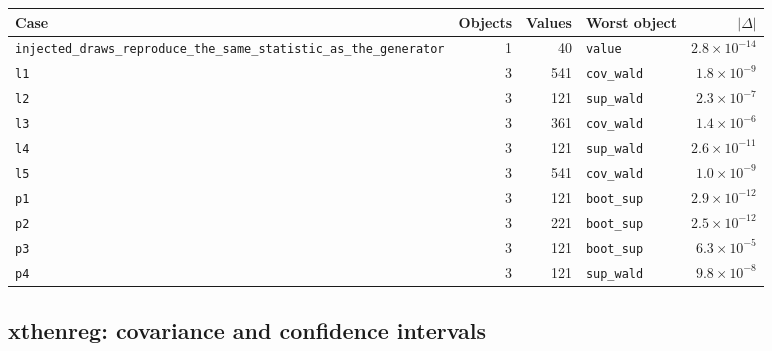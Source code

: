 \documentclass[10.5pt,a4paper]{article}
\begin{document}
\begin{longtable}{@{}p{3.6cm}rrp{4.9cm}r@{}}
\toprule
Case & Objects & Values & Worst object & $|\Delta|$ \\
\midrule
\endhead
\texttt{injected\_\allowbreak{}draws\_\allowbreak{}reproduce\_\allowbreak{}the\_\allowbreak{}same\_\allowbreak{}statistic\_\allowbreak{}as\_\allowbreak{}the\_\allowbreak{}generator} & 1 & 40 & \texttt{value} & $2.8\times10^{-14}$ \\
\texttt{l1} & 3 & 541 & \texttt{cov\_\allowbreak{}wald} & $1.8\times10^{-9}$ \\
\texttt{l2} & 3 & 121 & \texttt{sup\_\allowbreak{}wald} & $2.3\times10^{-7}$ \\
\texttt{l3} & 3 & 361 & \texttt{cov\_\allowbreak{}wald} & $1.4\times10^{-6}$ \\
\texttt{l4} & 3 & 121 & \texttt{sup\_\allowbreak{}wald} & $2.6\times10^{-11}$ \\
\texttt{l5} & 3 & 541 & \texttt{cov\_\allowbreak{}wald} & $1.0\times10^{-9}$ \\
\texttt{p1} & 3 & 121 & \texttt{boot\_\allowbreak{}sup} & $2.9\times10^{-12}$ \\
\texttt{p2} & 3 & 221 & \texttt{boot\_\allowbreak{}sup} & $2.5\times10^{-12}$ \\
\texttt{p3} & 3 & 121 & \texttt{boot\_\allowbreak{}sup} & $6.3\times10^{-5}$ \\
\texttt{p4} & 3 & 121 & \texttt{sup\_\allowbreak{}wald} & $9.8\times10^{-8}$ \\
\bottomrule
\end{longtable}

\subsection*{xthenreg: covariance and confidence intervals}
\end{document}
